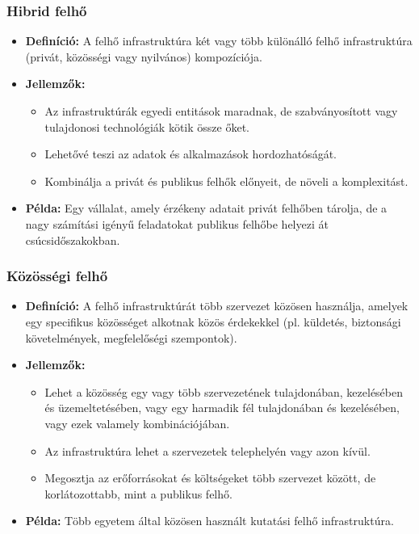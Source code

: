\documentclass[a4paper,12pt]{article}
\begin{document}
    \subsubsection{Hibrid felhő}

    \begin{itemize}
        \item \textbf{Definíció:} A felhő infrastruktúra két vagy több különálló felhő infrastruktúra (privát, közösségi vagy nyilvános) kompozíciója.

        \item \textbf{Jellemzők:}
        \begin{itemize}
            \item Az infrastruktúrák egyedi entitások maradnak, de szabványosított vagy tulajdonosi technológiák kötik össze őket.
            \item Lehetővé teszi az adatok és alkalmazások hordozhatóságát.
            \item Kombinálja a privát és publikus felhők előnyeit, de növeli a komplexitást.
        \end{itemize}

        \item \textbf{Példa:} Egy vállalat, amely érzékeny adatait privát felhőben tárolja, de a nagy számítási igényű feladatokat publikus felhőbe helyezi át csúcsidőszakokban.
    \end{itemize}

    \subsubsection{Közösségi felhő}

    \begin{itemize}
        \item \textbf{Definíció:} A felhő infrastruktúrát több szervezet közösen használja, amelyek egy specifikus közösséget alkotnak közös érdekekkel (pl. küldetés, biztonsági követelmények, megfelelőségi szempontok).

        \item \textbf{Jellemzők:}
        \begin{itemize}
            \item Lehet a közösség egy vagy több szervezetének tulajdonában, kezelésében és üzemeltetésében, vagy egy harmadik fél tulajdonában és kezelésében, vagy ezek valamely kombinációjában.
            \item Az infrastruktúra lehet a szervezetek telephelyén vagy azon kívül.
            \item Megosztja az erőforrásokat és költségeket több szervezet között, de korlátozottabb, mint a publikus felhő.
        \end{itemize}

        \item \textbf{Példa:} Több egyetem által közösen használt kutatási felhő infrastruktúra.
    \end{itemize}
\end{document}
